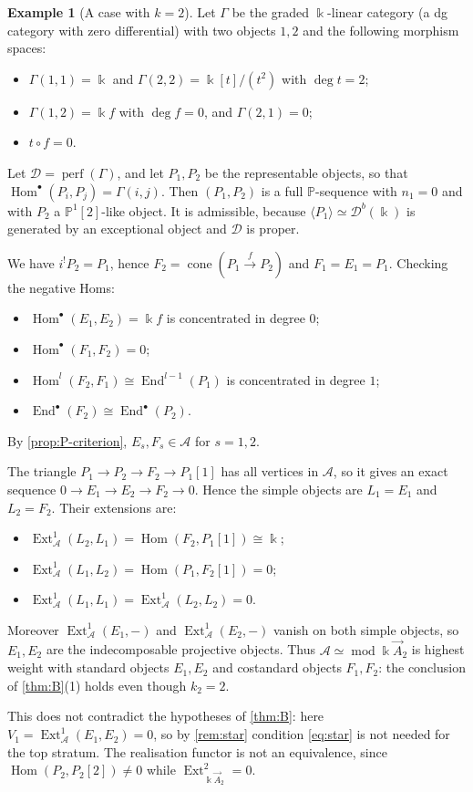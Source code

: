 \documentclass[11pt,reqno]{amsart}
\theoremstyle{plain}
\theoremstyle{definition}
\newtheorem{example}[theorem]{Example}
\theoremstyle{remark}
\newcommand{\kk}{\Bbbk}
\DeclareMathOperator{\Hom}{Hom}
\DeclareMathOperator{\End}{End}
\DeclareMathOperator{\Ext}{Ext}
\DeclareMathOperator{\cone}{cone}
\newcommand{\modd}{\operatorname{mod}}
\newcommand{\Db}{\mathcal{D}^b}
\newcommand{\thick}[1]{\langle #1\rangle}
\newcommand{\Pn}[2]{\mathbb{P}^{#1}[#2]}
\newcommand{\cD}{\mathcal{D}}
\newcommand{\cA}{\mathcal{A}}
\begin{document}
\begin{example}[A case with $k=2$]\label{ex:k2}
Let $\Gamma$ be the graded $\kk$-linear category (a dg category with zero differential) with two objects $1,2$ and the following morphism spaces:
\begin{itemize}
\item $\Gamma(1,1)=\kk$ and $\Gamma(2,2)=\kk[t]/(t^2)$ with $\deg t=2$;
\item $\Gamma(1,2)=\kk f$ with $\deg f=0$, and $\Gamma(2,1)=0$;
\item $t\circ f=0$.
\end{itemize}
Let $\cD=\operatorname{perf}(\Gamma)$, and let $P_1,P_2$ be the representable objects, so that $\Hom^\bullet(P_i,P_j)=\Gamma(i,j)$. Then $(P_1,P_2)$ is a full $\mathbb{P}$-sequence with $n_1=0$ and with $P_2$ a $\Pn12$-like object. It is admissible, because $\thick{P_1}\simeq\Db(\kk)$ is generated by an exceptional object and $\cD$ is proper.

We have $i^!P_2=P_1$, hence $F_2=\cone(P_1\xrightarrow{f}P_2)$ and $F_1=E_1=P_1$. Checking the negative Homs:
\begin{itemize}
\item $\Hom^\bullet(E_1,E_2)=\kk f$ is concentrated in degree $0$;
\item $\Hom^\bullet(F_1,F_2)=0$;
\item $\Hom^l(F_2,F_1)\cong\End^{l-1}(P_1)$ is concentrated in degree $1$;
\item $\End^\bullet(F_2)\cong\End^\bullet(P_2)$.
\end{itemize}
By \cref{prop:P-criterion}, $E_s,F_s\in\cA$ for $s=1,2$.

The triangle $P_1\to P_2\to F_2\to P_1[1]$ has all vertices in $\cA$, so it gives an exact sequence $0\to E_1\to E_2\to F_2\to0$. Hence the simple objects are $L_1=E_1$ and $L_2=F_2$. Their extensions are:
\begin{itemize}
\item $\Ext^1_\cA(L_2,L_1)=\Hom(F_2,P_1[1])\cong\kk$;
\item $\Ext^1_\cA(L_1,L_2)=\Hom(P_1,F_2[1])=0$;
\item $\Ext^1_\cA(L_1,L_1)=\Ext^1_\cA(L_2,L_2)=0$.
\end{itemize}
Moreover $\Ext^1_\cA(E_1,-)$ and $\Ext^1_\cA(E_2,-)$ vanish on both simple objects, so $E_1,E_2$ are the indecomposable projective objects. Thus $\cA\simeq\modd\kk\vec A_2$ is highest weight with standard objects $E_1,E_2$ and costandard objects $F_1,F_2$: the conclusion of \cref{thm:B}(1) holds even though $k_2=2$.

This does not contradict the hypotheses of \cref{thm:B}: here $V_1=\Ext^1_\cA(E_1,E_2)=0$, so by \cref{rem:star} condition \eqref{eq:star} is not needed for the top stratum. The realisation functor is not an equivalence, since $\Hom(P_2,P_2[2])\ne0$ while $\Ext^2_{\kk\vec A_2}=0$.
\end{example}
\end{document}

